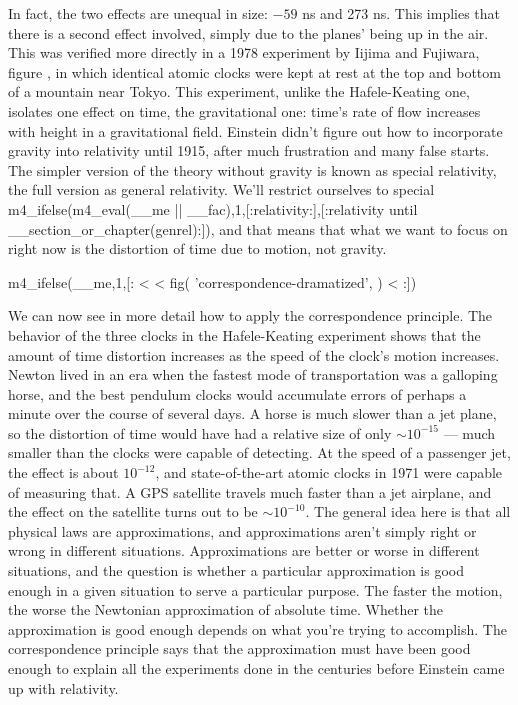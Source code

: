 In fact, the two effects are unequal in size: $-59$ ns and 273 ns. This
implies that there is a second effect involved, simply due to the planes' being up in the air.
This was verified more directly in a 1978 experiment by Iijima and Fujiwara, figure , in which identical atomic
clocks were kept at rest at the top and bottom of a mountain near Tokyo.
This experiment, unlike the Hafele-Keating one, isolates one effect on time, the gravitational one: time's
rate of flow increases with height in a gravitational field. Einstein didn't figure out
how to incorporate gravity into relativity until 1915, after much frustration and many false starts. The
simpler version of the theory without gravity is known as special relativity, the full version as general
relativity. We'll restrict ourselves to 
special m4_ifelse(m4_eval(__me || __fac),1,[:relativity:],[:relativity until __section_or_chapter(genrel):]), and
that means that what we want to
focus on right now is the distortion of time due to motion, not gravity.\label{iijima}


m4_ifelse(__me,1,[: %
<%
<%
  fig(
    'correspondence-dramatized',
  )
<%
:]) %

We can now see in more detail how to apply the correspondence principle. The behavior of the three clocks in the
Hafele-Keating experiment shows that the amount of time distortion increases as the speed of the clock's motion
increases. Newton lived in an era when the fastest
mode of transportation was a galloping horse, and the best
pendulum clocks would accumulate errors of perhaps a minute over the course of several days.
A horse is much slower than a jet plane, so the
distortion of time would have had a relative size of only $\sim10^{-15}$ --- much smaller than the clocks were capable of detecting.
At the speed of a passenger jet, the effect is about $10^{-12}$,
and state-of-the-art atomic clocks in 1971 were capable of measuring that.
A GPS satellite travels much faster than a jet airplane, and the effect on the satellite
turns out to be $\sim10^{-10}$. The general idea here is that all physical laws are approximations, and
approximations aren't simply right or wrong in different situations. Approximations are better or worse
in different situations, and the question is whether a particular approximation is good enough in a given
situation to serve a particular purpose. The faster the motion, the worse the Newtonian approximation of
absolute time. Whether the approximation is good enough depends on what you're trying to accomplish.
The correspondence principle says that the approximation must have been good enough to explain
all the experiments done in the centuries before Einstein came up with relativity.

